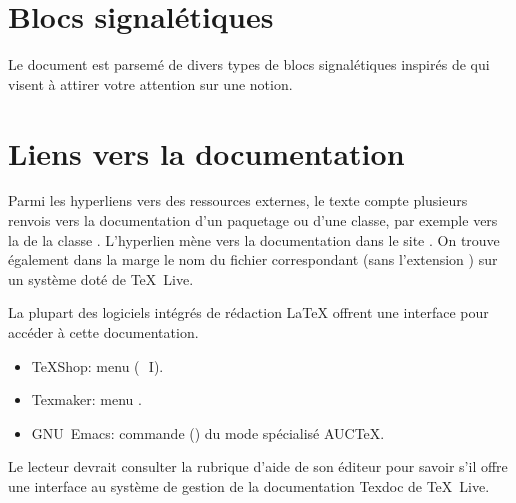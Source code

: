 \section*{Blocs signalétiques}

Le document est parsemé de divers types de blocs signalétiques
inspirés de
qui visent à attirer votre attention sur une notion.

\vspace{-\baselineskip}

\vspace{-\baselineskip}

\vspace{-\baselineskip}


\section*{Liens vers la documentation}

Parmi les hyperliens vers des ressources externes, le texte compte
plusieurs renvois vers la documentation d'un paquetage ou d'une
classe, par exemple vers la %
de la classe . L'hyperlien mène vers la documentation
dans le site %
. On trouve également dans la
marge le nom du fichier correspondant (sans l'extension )
sur un système doté de {\TeX}~Live.

La plupart des logiciels intégrés de rédaction {\LaTeX} offrent une
interface pour accéder à cette documentation.
\begin{itemize}
\item TeXShop: menu  (\optkey\,\cmdkey\, I).
\item Texmaker: menu .
\item GNU~Emacs: commande  () du mode
  spécialisé AUC{\TeX}.
\end{itemize}
Le lecteur devrait consulter la rubrique d'aide de son éditeur pour
savoir s'il offre une interface au système de gestion de la
documentation Texdoc de {\TeX}~Live.

